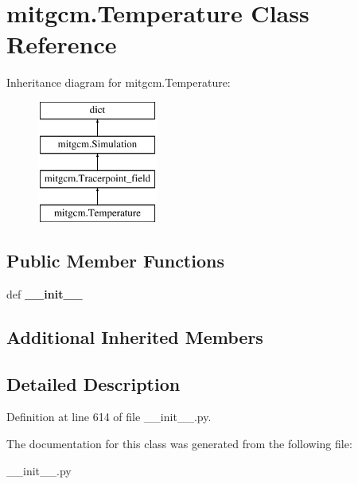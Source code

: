 \hypertarget{classmitgcm_1_1Temperature}{\section{mitgcm.\+Temperature Class Reference}
\label{classmitgcm_1_1Temperature}
}
Inheritance diagram for mitgcm.\+Temperature\+:\begin{figure}[H]
\begin{center}
\leavevmode
\includegraphics[height=4.000000cm]{classmitgcm_1_1Temperature}
\end{center}
\end{figure}
\subsection*{Public Member Functions}
\begin{DoxyCompactItemize}
\item 
\hypertarget{classmitgcm_1_1Temperature_af8a4e75bd94a1c6ab81f96ef0c4179f7}{def {\bfseries \+\_\+\+\_\+init\+\_\+\+\_\+}}\label{classmitgcm_1_1Temperature_af8a4e75bd94a1c6ab81f96ef0c4179f7}

\end{DoxyCompactItemize}
\subsection*{Additional Inherited Members}


\subsection{Detailed Description}


Definition at line 614 of file \+\_\+\+\_\+init\+\_\+\+\_\+.\+py.



The documentation for this class was generated from the following file\+:\begin{DoxyCompactItemize}
\item 
\+\_\+\+\_\+init\+\_\+\+\_\+.\+py\end{DoxyCompactItemize}
